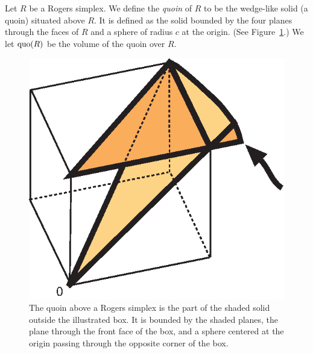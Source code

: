 \begin{definition}\label{def:quoin}
Let $R$ be a Rogers simplex.  We define the {\it quoin} of $R$ to
be the  wedge-like solid (a quoin) situated above $R$. It is
defined as the solid bounded by the four planes through the faces
of $R$ and a sphere of radius $c$ at the origin. (See
Figure~\ref{fig:quoin}.)   We let $\operatorname{quo}(R)$ be the volume of the
quoin over $R$.    
%
\end{definition}


\begin{figure}[htb]
  \centering
  \includegraphics{PS/quoin.eps}
  \caption{The quoin above a Rogers simplex is the part of the
  shaded solid outside
   the illustrated box.  It is bounded by the shaded planes, the plane through
   the front face of the box, and a sphere
   centered at the origin passing through the opposite corner of the box.}
  \label{fig:quoin}
\end{figure}

